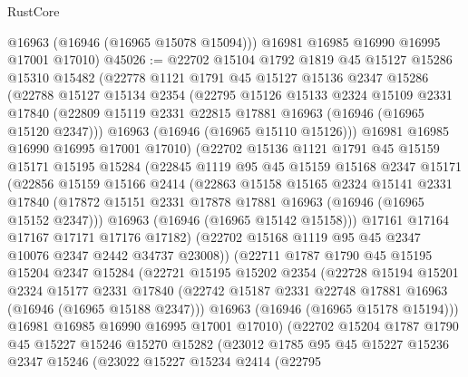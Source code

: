 \begin{lexlean}{RustCore}
\begin{coremodule}
        @16963
        (@16946 (@16965 @15078 @15094)))
      @16981
      @16985
      @16990
      @16995
      @17001
      @17010)
@45026 := @22702
    @15104
    @1792
    @1819
    @45
    @15127
    @15286
    @15310
    @15482
    (@22778
      @1121
      @1791
      @45
      @15127
      @15136
      @2347
      @15286
      (@22788
        @15127
        @15134
        @2354
        (@22795
          @15126
          @15133
          @2324
          @15109
          @2331
          @17840
          (@22809 @15119 @2331 @22815 @17881 @16963 (@16946 (@16965 @15120 @2347)))
          @16963
          (@16946 (@16965 @15110 @15126)))
        @16981
        @16985
        @16990
        @16995
        @17001
        @17010)
      (@22702
        @15136
        @1121
        @1791
        @45
        @15159
        @15171
        @15195
        @15284
        (@22845
          @1119
          @95
          @45
          @15159
          @15168
          @2347
          @15171
          (@22856
            @15159
            @15166
            @2414
            (@22863
              @15158
              @15165
              @2324
              @15141
              @2331
              @17840
              (@17872 @15151 @2331 @17878 @17881 @16963 (@16946 (@16965 @15152 @2347)))
              @16963
              (@16946 (@16965 @15142 @15158)))
            @17161
            @17164
            @17167
            @17171
            @17176
            @17182)
          (@22702 @15168 @1119 @95 @45 @2347 @10076 @2347 @2442 @34737 @23008))
        (@22711
          @1787
          @1790
          @45
          @15195
          @15204
          @2347
          @15284
          (@22721
            @15195
            @15202
            @2354
            (@22728
              @15194
              @15201
              @2324
              @15177
              @2331
              @17840
              (@22742 @15187 @2331 @22748 @17881 @16963 (@16946 (@16965 @15188 @2347)))
              @16963
              (@16946 (@16965 @15178 @15194)))
            @16981
            @16985
            @16990
            @16995
            @17001
            @17010)
          (@22702
            @15204
            @1787
            @1790
            @45
            @15227
            @15246
            @15270
            @15282
            (@23012
              @1785
              @95
              @45
              @15227
              @15236
              @2347
              @15246
              (@23022
                @15227
                @15234
                @2414
                (@22795

\end{coremodule}
\end{lexlean}
